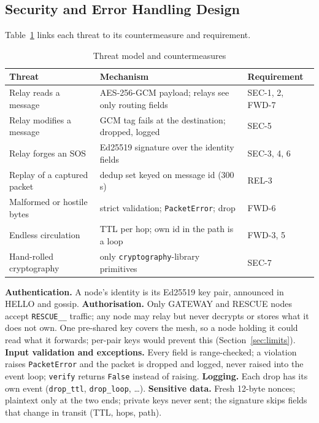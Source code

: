\subsection{Security and Error Handling Design}
\label{sec:secdesign}
Table~\ref{tab:threat} links each threat to its countermeasure and requirement.
\begin{table}[!htbp]
\caption{Threat model and countermeasures}
\label{tab:threat}
\footnotesize
\begin{tabularx}{\textwidth}{@{}>{\raggedright\arraybackslash}p{4.0cm}>{\raggedright\arraybackslash}X>{\raggedright\arraybackslash}p{2.6cm}@{}}
\toprule
\textbf{Threat} & \textbf{Mechanism} & \textbf{Requirement}\\ \midrule
Relay reads a message & AES-256-GCM payload; relays see only routing fields & SEC-1, 2, FWD-7\\
Relay modifies a message & GCM tag fails at the destination; dropped, logged & SEC-5\\
Relay forges an SOS & Ed25519 signature over the identity fields & SEC-3, 4, 6\\
Replay of a captured packet & dedup set keyed on message id (300\,s) & REL-3\\
Malformed or hostile bytes & strict validation; \texttt{PacketError}; drop & FWD-6\\
Endless circulation & TTL per hop; own id in the path is a loop & FWD-3, 5\\
Hand-rolled cryptography & only \texttt{cryptography}-library primitives & SEC-7\\
\bottomrule
\end{tabularx}
\end{table}
\textbf{Authentication.} A node's identity is its Ed25519 key pair, announced in HELLO and gossip. \textbf{Authorisation.} Only GATEWAY and RESCUE nodes accept \texttt{RESCUE\_\_} traffic; any node may relay but never decrypts or stores what it does not own. One pre-shared key covers the mesh, so a node holding it could read what it forwards; per-pair keys would prevent this (Section~\ref{sec:limits}). \textbf{Input validation and exceptions.} Every field is range-checked; a violation raises \texttt{PacketError} and the packet is dropped and logged, never raised into the event loop; \texttt{verify} returns \texttt{False} instead of raising. \textbf{Logging.} Each drop has its own event (\texttt{drop\_ttl}, \texttt{drop\_loop}, \ldots). \textbf{Sensitive data.} Fresh 12-byte nonces; plaintext only at the two ends; private keys never sent; the signature skips fields that change in transit (TTL, hops, path).
